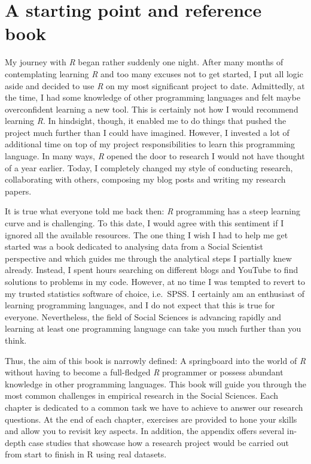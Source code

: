 \documentclass[
  letterpaper,
]{krantz}
\begin{document}
\section{A starting point and reference
book}\label{a-starting-point-and-reference-book}

My journey with \emph{R} began rather suddenly one night. After many
months of contemplating learning \emph{R} and too many excuses not to
get started, I put all logic aside and decided to use \emph{R} on my
most significant project to date. Admittedly, at the time, I had some
knowledge of other programming languages and felt maybe overconfident
learning a new tool. This is certainly not how I would recommend
learning \emph{R}. In hindsight, though, it enabled me to do things that
pushed the project much further than I could have imagined. However, I
invested a lot of additional time on top of my project responsibilities
to learn this programming language. In many ways, \emph{R} opened the
door to research I would not have thought of a year earlier. Today, I
completely changed my style of conducting research, collaborating with
others, composing my blog posts and writing my research papers.

It is true what everyone told me back then: \emph{R} programming has a
steep learning curve and is challenging. To this date, I would agree
with this sentiment if I ignored all the available resources. The one
thing I wish I had to help me get started was a book dedicated to
analysing data from a Social Scientist perspective and which guides me
through the analytical steps I partially knew already. Instead, I spent
hours searching on different blogs and YouTube to find solutions to
problems in my code. However, at no time I was tempted to revert to my
trusted statistics software of choice, i.e.~SPSS. I certainly am an
enthusiast of learning programming languages, and I do not expect that
this is true for everyone. Nevertheless, the field of Social Sciences is
advancing rapidly and learning at least one programming language can
take you much further than you think.

Thus, the aim of this book is narrowly defined: A springboard into the
world of \emph{R} without having to become a full-fledged \emph{R}
programmer or possess abundant knowledge in other programming languages.
This book will guide you through the most common challenges in empirical
research in the Social Sciences. Each chapter is dedicated to a common
task we have to achieve to answer our research questions. At the end of
each chapter, exercises are provided to hone your skills and allow you
to revisit key aspects. In addition, the appendix offers several
in-depth case studies that showcase how a research project would be
carried out from start to finish in R using real datasets.
\end{document}
